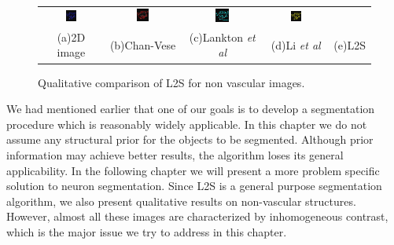 \begin{figure}[t]
\begin{tabular}{@{}ccccc@{}}
\includegraphics[width=0.19\textwidth]{images/L2S_compare_region/yeast_CV}	&
\includegraphics[width=0.19\textwidth]{images/L2S_compare_region/yeast_Lankton} &
\includegraphics[width=0.19\textwidth]{images/L2S_compare_region/yeast_Li}	&
\includegraphics[width=0.19\textwidth]{images/L2S_compare_region/yeast_ours}\\
\scriptsize(a)2D image&\scriptsize(b)Chan-Vese&\scriptsize(c)Lankton \textit{et al}\cite{lankton_localCV}&\scriptsize(d)Li \textit{et al}\cite{li_region_scalable}&\scriptsize(e)L2S
\end{tabular}
\caption[L2S on vascular images]{Qualitative comparison of L2S for non vascular images.}
\label{fig:l2s_compare_nonvessel}
\end{figure}
\clearpage
We had mentioned earlier that one of our goals is to develop a segmentation procedure which is reasonably widely applicable. In this chapter we do not assume any structural prior for the objects to be segmented. Although prior information may achieve better results, the algorithm loses its general applicability. In the following chapter we will present a more problem specific solution to neuron segmentation. Since L2S is a general purpose segmentation algorithm, we also present qualitative results on non-vascular structures. However, almost all these images are characterized by inhomogeneous contrast, which is the major issue we try to address in this chapter. 

